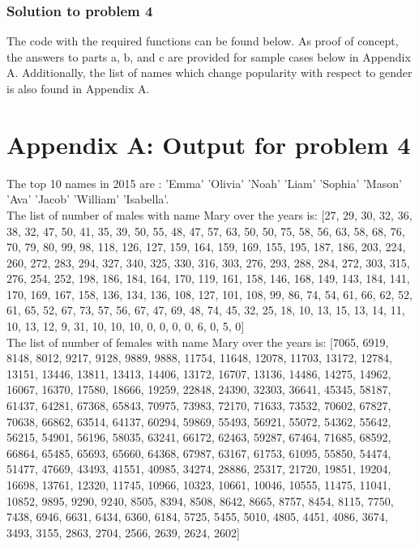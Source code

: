 \documentclass[12pt]{article}%
\begin{document}
\subsubsection{Solution to problem 4}

The code with the required functions can be found below. As proof of concept, the answers to parts a, b, and c are provided for sample cases below in Appendix A. Additionally, the list of names which change popularity with respect to gender is also found in Appendix A.


\newpage
\section*{Appendix A: Output for problem 4}

The top 10 names in 2015 are : 'Emma' 'Olivia' 'Noah' 'Liam' 'Sophia' 'Mason' 'Ava' 'Jacob' 'William' 'Isabella'.\\

The list of number of males with name  Mary  over the years is: [27, 29, 30, 32, 36, 38, 32, 47, 50, 41, 35, 39, 50, 55, 48, 47, 57, 63, 50, 50, 75, 58, 56, 63, 58, 68, 76, 70, 79, 80, 99, 98, 118, 126, 127, 159, 164, 159, 169, 155, 195, 187, 186, 203, 224, 260, 272, 283, 294, 327, 340, 325, 330, 316, 303, 276, 293, 288, 284, 272, 303, 315, 276, 254, 252, 198, 186, 184, 164, 170, 119, 161, 158, 146, 168, 149, 143, 184, 141, 170, 169, 167, 158, 136, 134, 136, 108, 127, 101, 108, 99, 86, 74, 54, 61, 66, 62, 52, 61, 65, 52, 67, 73, 57, 56, 67, 47, 69, 48, 74, 45, 32, 25, 18, 10, 13, 15, 13, 14, 11, 10, 13, 12, 9, 31, 10, 10, 10, 0, 0, 0, 0, 6, 0, 5, 0]\\
The list of number of females with name  Mary  over the years is: [7065, 6919, 8148, 8012, 9217, 9128, 9889, 9888, 11754, 11648, 12078, 11703, 13172, 12784, 13151, 13446, 13811, 13413, 14406, 13172, 16707, 13136, 14486, 14275, 14962, 16067, 16370, 17580, 18666, 19259, 22848, 24390, 32303, 36641, 45345, 58187, 61437, 64281, 67368, 65843, 70975, 73983, 72170, 71633, 73532, 70602, 67827, 70638, 66862, 63514, 64137, 60294, 59869, 55493, 56921, 55072, 54362, 55642, 56215, 54901, 56196, 58035, 63241, 66172, 62463, 59287, 67464, 71685, 68592, 66864, 65485, 65693, 65660, 64368, 67987, 63167, 61753, 61095, 55850, 54474, 51477, 47669, 43493, 41551, 40985, 34274, 28886, 25317, 21720, 19851, 19204, 16698, 13761, 12320, 11745, 10966, 10323, 10661, 10046, 10555, 11475, 11041, 10852, 9895, 9290, 9240, 8505, 8394, 8508, 8642, 8665, 8757, 8454, 8115, 7750, 7438, 6946, 6631, 6434, 6360, 6184, 5725, 5455, 5010, 4805, 4451, 4086, 3674, 3493, 3155, 2863, 2704, 2566, 2639, 2624, 2602]
\end{document}
